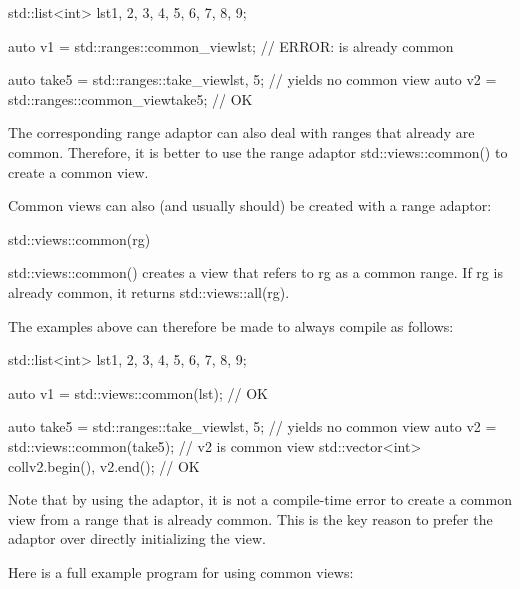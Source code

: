 \begin{cpp}
std::list<int> lst{1, 2, 3, 4, 5, 6, 7, 8, 9};

auto v1 = std::ranges::common_view{lst}; // ERROR: is already common

auto take5 = std::ranges::take_view{lst, 5}; // yields no common view
auto v2 = std::ranges::common_view{take5}; // OK
\end{cpp}

The corresponding range adaptor can also deal with ranges that already are common. Therefore, it is better to use the range adaptor std::views::common() to create a common view.


Common views can also (and usually should) be created with a range adaptor:

\begin{cpp}
std::views::common(rg)
\end{cpp}

std::views::common() creates a view that refers to rg as a common range. If rg is already common, it returns std::views::all(rg).

The examples above can therefore be made to always compile as follows:

\begin{cpp}
std::list<int> lst{1, 2, 3, 4, 5, 6, 7, 8, 9};

auto v1 = std::views::common(lst); // OK

auto take5 = std::ranges::take_view{lst, 5}; // yields no common view
auto v2 = std::views::common(take5); // v2 is common view
std::vector<int> coll{v2.begin(), v2.end()}; // OK
\end{cpp}

Note that by using the adaptor, it is not a compile-time error to create a common view from a range that is already common. This is the key reason to prefer the adaptor over directly initializing the view.

Here is a full example program for using common views:


